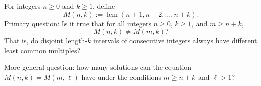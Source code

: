 For integers $n\ge 0$ and $k\ge 1$, define
\[
M(n,k):=\operatorname{lcm}(n+1,n+2,\dots,n+k).
\]
Primary question: Is it true that for all integers $n\ge 0$, $k\ge 1$, and $m\ge n+k$,
\[
 M(n,k)\ne M(m,k)?
\]
That is, do disjoint length-$k$ intervals of consecutive integers always have different least common multiples?

More general question: how many solutions can the equation $M(n,k)=M(m,\ell)$ have under the conditions $m\ge n+k$ and $\ell>1$?
